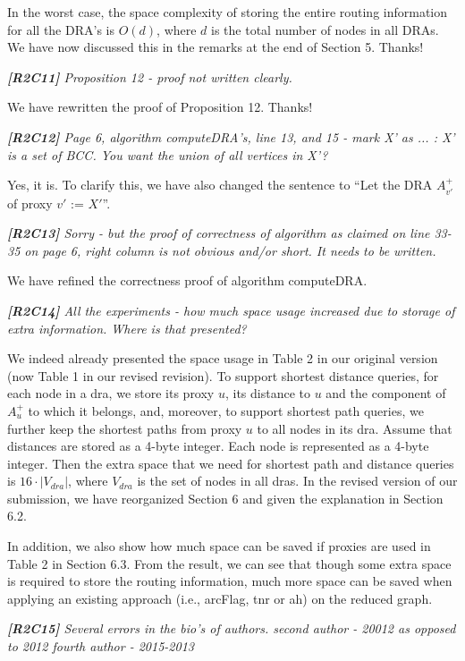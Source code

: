 \documentclass[11pt]{letter}
\newcommand{\vs}{\vspace{1ex}}
\newcommand{\svs}{\vspace{0.36ex}}
\newcommand{\ah}{{\sc ah}\xspace}
\newcommand{\arcflag}{{\sc arcFlag}\xspace}
\newcommand{\tnr}{{\sc tnr}\xspace}
\newcommand{\dra}{{\sc dra}\xspace}
\newcommand{\dras}{{\sc dra}s\xspace}
\begin{document}
In the worst case, the space complexity of storing the entire routing information for all the DRA's is $O(d)$, where $d$ is the total number of nodes in all DRAs. We have now discussed this in the remarks at the end of Section 5. Thanks!



\vs
\noindent
{\em{\bf[R2C11]} Proposition 12 - proof not written clearly.}

\svs
We have rewritten the proof of Proposition 12. Thanks!

\vs
\noindent
{\em{\bf[R2C12]} Page 6, algorithm computeDRA's, line 13, and 15 - mark X' as ... : X' is a set of BCC. You want the union of all vertices in X'?}
\svs

Yes, it is. To clarify this, we have also changed the sentence to ``Let the DRA $A^+_{v'}$ of proxy $v'$ := $X'$''.


\vs
\noindent
{\em{\bf[R2C13]} Sorry - but the proof of correctness of algorithm as claimed on line 33-35 on page 6, right column is not obvious and/or short. It needs to be written.}

\svs
We have refined the correctness proof of algorithm computeDRA.


\vs
\noindent
{\em{\bf[R2C14]} All the experiments - how much space usage increased due to storage of extra information. Where is that presented?}

\svs
We indeed already presented the space usage in Table 2 in our original version (now Table 1 in our revised revision). To support shortest distance queries, for each node in a \dra, we store its proxy $u$, its distance to $u$ and the component of $A^{+}_u$ to which it belongs, and, moreover, to support shortest path queries, we further keep the shortest paths from proxy $u$ to all nodes in its \dra. Assume that distances are stored as a 4-byte integer. Each node is represented as a 4-byte integer. Then the extra space that we need for shortest path and distance queries is $16\cdot |V_{dra}|$, where $V_{dra}$ is the set of nodes in all \dras. In the revised version of our submission, we have reorganized Section 6 and given the explanation in Section 6.2.

In addition, we also show how much space can be saved if proxies are used in Table 2 in Section 6.3. From the result, we can see that though some extra space is required to store the routing information, much more space can be saved when applying an existing approach (i.e., \arcflag, \tnr or \ah) on the reduced graph.

\vs
\noindent
{\em{\bf[R2C15]} Several errors in the bio's of authors.
second author - 20012 as opposed to 2012
fourth author - 2015-2013}
\end{document}
